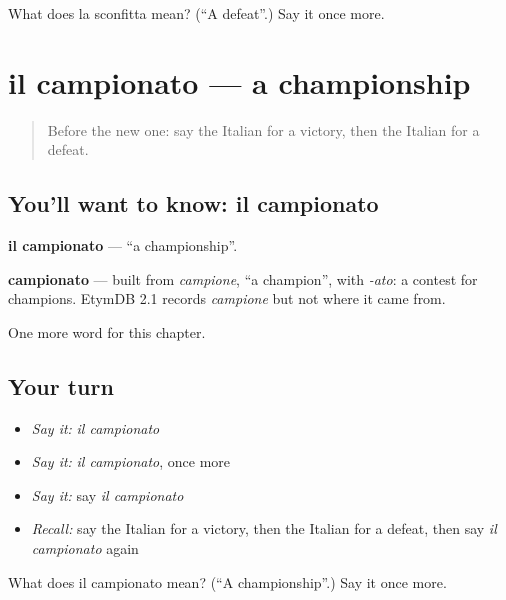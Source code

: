\begin{tcolorbox}[breakable,colback=teal!4,colframe=teal!35!black,title={Before you move on}]
What does la sconfitta mean? (\textquotedblleft{}A defeat\textquotedblright{}.) Say it once more.
\end{tcolorbox}
\section[il campionato]{il campionato — a championship}

\label{lesson:IT-C231-campionato}



\begin{quote}
Before the new one: say the Italian for a victory, then the Italian for a defeat.
\end{quote}

\subsection*{You'll want to know: il campionato}
\textbf{il campionato} — \textquotedblleft{}a championship\textquotedblright{}.

\begin{cousinweb}
\textbf{campionato} — built from \emph{campione}, \textquotedblleft{}a champion\textquotedblright{}, with \emph{-ato}: a contest for champions. EtymDB 2.1 records \emph{campione} but not where it came from.
\end{cousinweb}

\begin{grammarlens}[title={What you've built}]
One more word for this chapter.
\end{grammarlens}

\subsection*{Your turn}
\begin{itemize}
\raggedright
  \item \emph{Say it:} \emph{il campionato}
  \item \emph{Say it:} \emph{il campionato}, once more
  \item \emph{Say it:} say \emph{il campionato}
  \item \emph{Recall:} say the Italian for a victory, then the Italian for a defeat, then say \emph{il campionato} again
\end{itemize}

\begin{tcolorbox}[breakable,colback=teal!4,colframe=teal!35!black,title={Before you move on}]
What does il campionato mean? (\textquotedblleft{}A championship\textquotedblright{}.) Say it once more.
\end{tcolorbox}
